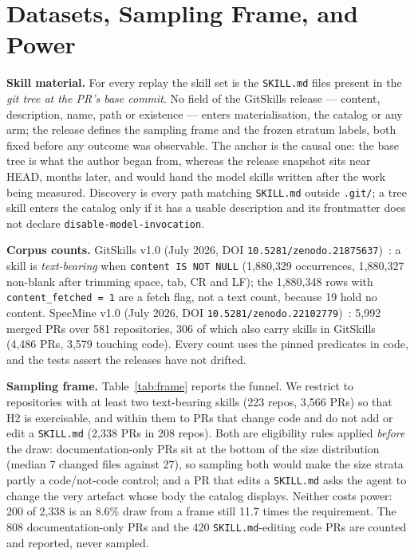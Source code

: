 \documentclass[10pt,conference]{IEEEtran}
\begin{document}
\section{Datasets, Sampling Frame, and Power}
\label{sec:data}
\textbf{Skill material.} For every replay the skill set is the \texttt{SKILL.md} files present in the \emph{git tree at the PR's base commit}. No field of the GitSkills release --- content, description, name, path or existence --- enters materialisation, the catalog or any arm; the release defines the sampling frame and the frozen stratum labels, both fixed before any outcome was observable. The anchor is the causal one: the base tree is what the author began from, whereas the release snapshot sits near HEAD, months later, and would hand the model skills written after the work being measured. Discovery is every path matching \texttt{SKILL.md} outside \texttt{.git/}; a tree skill enters the catalog only if it has a usable description and its frontmatter does not declare \texttt{disable-model-invocation}.

\textbf{Corpus counts.} GitSkills v1.0 (July 2026, DOI \texttt{10.5281/zenodo.21875637})~\cite{gitskills}: a skill is \emph{text-bearing} when \texttt{content IS NOT NULL} (1{,}880{,}329 occurrences, 1{,}880{,}327 non-blank after trimming space, tab, CR and LF); the 1{,}880{,}348 rows with \texttt{content\_fetched = 1} are a fetch flag, not a text count, because 19 hold no content. SpecMine v1.0 (July 2026, DOI \texttt{10.5281/zenodo.22102779})~\cite{specmine}: 5{,}992 merged PRs over 581 repositories, 306 of which also carry skills in GitSkills (4{,}486 PRs, 3{,}579 touching code). Every count uses the pinned predicates in code, and the tests assert the releases have not drifted.

\textbf{Sampling frame.} Table~\ref{tab:frame} reports the funnel. We restrict to repositories with at least two text-bearing skills (223 repos, 3{,}566 PRs) so that H2 is exercisable, and within them to PRs that change code and do not add or edit a \texttt{SKILL.md} (2{,}338 PRs in 208 repos). Both are eligibility rules applied \emph{before} the draw: documentation-only PRs sit at the bottom of the size distribution (median 7 changed files against 27), so sampling both would make the size strata partly a code/not-code control; and a PR that edits a \texttt{SKILL.md} asks the agent to change the very artefact whose body the catalog displays. Neither costs power: 200 of 2{,}338 is an 8.6\% draw from a frame still 11.7 times the requirement. The 808 documentation-only PRs and the 420 \texttt{SKILL.md}-editing code PRs are counted and reported, never sampled.
\end{document}
